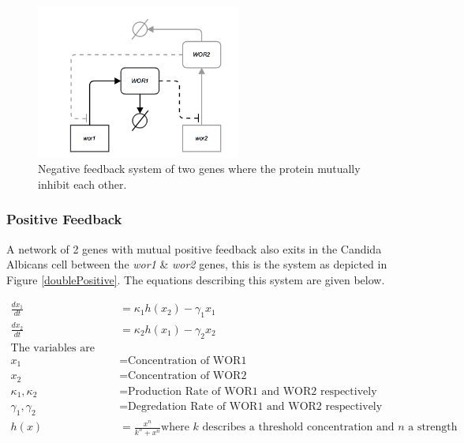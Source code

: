 \documentclass[]{article}
\begin{document}
        \begin{figure}[h]
        \centering
        \includegraphics[width=0.6\textwidth]{./figures/doubleNegative.png}
        \caption{Negative feedback system of two genes where the protein mutually inhibit each other.}
        \label{doubleNegative}
        \end{figure}
                 
            \subsubsection{Positive Feedback}
            A network of 2 genes with mutual positive feedback also exits in the Candida Albicans cell between the \textit{wor1} \& \textit{wor2} genes, this is the system as depicted in Figure \ref{doublePositive}. The equations describing this system are given below.
            
            \begin{align*}
                \frac{dx_1}{dt} &= \kappa_1 h(x_2) - \gamma_1 x_1 \\
                \frac{dx_2}{dt} &= \kappa_2 h(x_1) - \gamma_2 x_2 \\
                \text{The variables are denoted as:}&\\
                x_1 &= \text{Concentration of WOR1}\\
                x_2 &= \text{Concentration of WOR2}\\
                \kappa_1, \kappa_2 &= \text{Production Rate of WOR1 and WOR2 respectively}\\
                \gamma_1, \gamma_2 &= \text{Degredation Rate of WOR1 and WOR2 respectively}\\
                h(x) &= \frac{x^n}{k^n+x^n} \text{where $k$ describes a threshold concentration and $n$ a strength}
            \end{align*}
            
\end{document}
